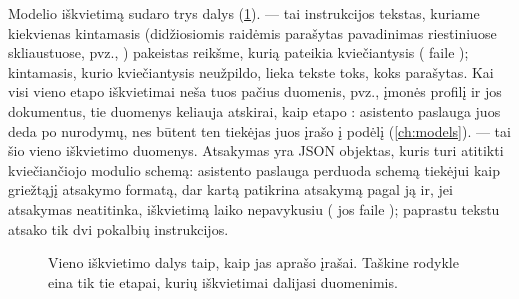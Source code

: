 Modelio iškvietimą sudaro trys dalys (\cref{fig:aprompts:call}).  --- tai
instrukcijos tekstas, kuriame kiekvienas kintamasis (didžiosiomis raidėmis parašytas pavadinimas
riestiniuose skliaustuose, pvz., ) pakeistas reikšme, kurią pateikia
kviečiantysis ( faile ); kintamasis, kurio kviečiantysis
neužpildo, lieka tekste toks, koks parašytas. Kai visi vieno etapo iškvietimai neša tuos pačius
duomenis, pvz., įmonės profilį ir jos dokumentus, tie duomenys keliauja atskirai, kaip etapo
: asistento paslauga juos deda po nurodymų, nes būtent ten tiekėjas juos
įrašo į podėlį (\cref{ch:models}).  --- tai šio vieno iškvietimo duomenys.
Atsakymas yra JSON objektas, kuris turi atitikti kviečiančiojo modulio schemą: asistento
paslauga perduoda schemą tiekėjui kaip griežtąjį atsakymo formatą, dar kartą patikrina atsakymą
pagal ją ir, jei atsakymas neatitinka, iškvietimą laiko nepavykusiu ( jos
faile ); paprastu tekstu atsako tik dvi pokalbių instrukcijos.

\begin{figure}[H]
\centering
{}
\actorlegend
\caption{Vieno iškvietimo dalys taip, kaip jas aprašo įrašai. Taškine rodykle eina tik tie
etapai, kurių iškvietimai dalijasi duomenimis.}\label{fig:aprompts:call}
\end{figure}

